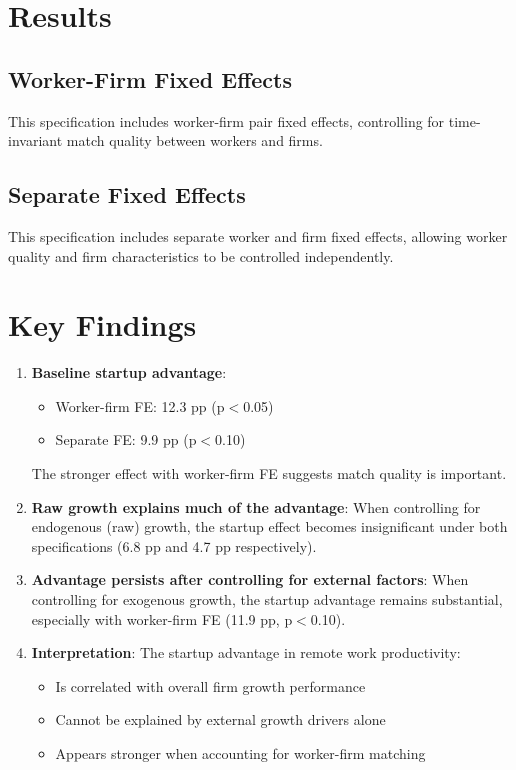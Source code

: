 \documentclass[11pt]{article}
\begin{document}
\section{Results}

\subsection{Worker-Firm Fixed Effects}

This specification includes worker-firm pair fixed effects, controlling for time-invariant match quality between workers and firms.



\subsection{Separate Fixed Effects}

This specification includes separate worker and firm fixed effects, allowing worker quality and firm characteristics to be controlled independently.



\section{Key Findings}

\begin{enumerate}
\item \textbf{Baseline startup advantage}: 
   \begin{itemize}
   \item Worker-firm FE: 12.3 pp (p$<$0.05)
   \item Separate FE: 9.9 pp (p$<$0.10)
   \end{itemize}
   The stronger effect with worker-firm FE suggests match quality is important.

\item \textbf{Raw growth explains much of the advantage}: When controlling for endogenous (raw) growth, the startup effect becomes insignificant under both specifications (6.8 pp and 4.7 pp respectively).

\item \textbf{Advantage persists after controlling for external factors}: When controlling for exogenous growth, the startup advantage remains substantial, especially with worker-firm FE (11.9 pp, p$<$0.10).

\item \textbf{Interpretation}: The startup advantage in remote work productivity:
   \begin{itemize}
   \item Is correlated with overall firm growth performance
   \item Cannot be explained by external growth drivers alone
   \item Appears stronger when accounting for worker-firm matching
   \end{itemize}
\end{enumerate}
\end{document}
